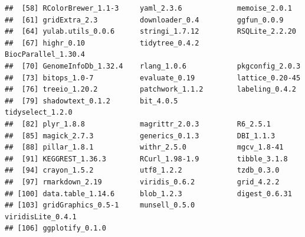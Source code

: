 \documentclass[
]{article}
\begin{document}
\begin{verbatim}
##  [58] RColorBrewer_1.1-3     yaml_2.3.6             memoise_2.0.1         
##  [61] gridExtra_2.3          downloader_0.4         ggfun_0.0.9           
##  [64] yulab.utils_0.0.6      stringi_1.7.12         RSQLite_2.2.20        
##  [67] highr_0.10             tidytree_0.4.2         BiocParallel_1.30.4   
##  [70] GenomeInfoDb_1.32.4    rlang_1.0.6            pkgconfig_2.0.3       
##  [73] bitops_1.0-7           evaluate_0.19          lattice_0.20-45       
##  [76] treeio_1.20.2          patchwork_1.1.2        labeling_0.4.2        
##  [79] shadowtext_0.1.2       bit_4.0.5              tidyselect_1.2.0      
##  [82] plyr_1.8.8             magrittr_2.0.3         R6_2.5.1              
##  [85] magick_2.7.3           generics_0.1.3         DBI_1.1.3             
##  [88] pillar_1.8.1           withr_2.5.0            mgcv_1.8-41           
##  [91] KEGGREST_1.36.3        RCurl_1.98-1.9         tibble_3.1.8          
##  [94] crayon_1.5.2           utf8_1.2.2             tzdb_0.3.0            
##  [97] rmarkdown_2.19         viridis_0.6.2          grid_4.2.2            
## [100] data.table_1.14.6      blob_1.2.3             digest_0.6.31         
## [103] gridGraphics_0.5-1     munsell_0.5.0          viridisLite_0.4.1     
## [106] ggplotify_0.1.0
\end{verbatim}
\end{document}
